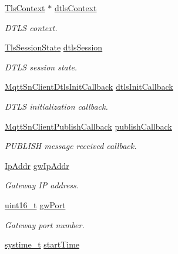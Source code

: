 \begin{DoxyCompactItemize}
\hyperlink{tls_8h_ac09f7a286c0cdf9b07ee1edd107946f5}{Tls\+Context} $\ast$ \hyperlink{struct__MqttSnClientContext_abf7251659cdc6c9ecd3d47335525c423}{dtls\+Context}
\begin{DoxyCompactList}\small\item\em D\+T\+LS context. \end{DoxyCompactList}\item 
\hyperlink{structTlsSessionState}{Tls\+Session\+State} \hyperlink{struct__MqttSnClientContext_a4b1830b1b171b20595d7aae273e3ecdd}{dtls\+Session}
\begin{DoxyCompactList}\small\item\em D\+T\+LS session state. \end{DoxyCompactList}\item 
\hyperlink{mqtt__sn__client_8h_a0aa65bd0e127e05595c247c01aeca2d5}{Mqtt\+Sn\+Client\+Dtls\+Init\+Callback} \hyperlink{struct__MqttSnClientContext_ab8aacb0497d1136187224400815cf184}{dtls\+Init\+Callback}
\begin{DoxyCompactList}\small\item\em D\+T\+LS initialization callback. \end{DoxyCompactList}\item 
\hyperlink{mqtt__sn__client_8h_a4f0890f5b533cda2ad972b1e433cf109}{Mqtt\+Sn\+Client\+Publish\+Callback} \hyperlink{struct__MqttSnClientContext_a7f815351293c416493cad33b87af151f}{publish\+Callback}
\begin{DoxyCompactList}\small\item\em P\+U\+B\+L\+I\+SH message received callback. \end{DoxyCompactList}\item 
\hyperlink{structIpAddr}{Ip\+Addr} \hyperlink{struct__MqttSnClientContext_a147c9e040547d21990c0ed14aa97fd8e}{gw\+Ip\+Addr}
\begin{DoxyCompactList}\small\item\em Gateway IP address. \end{DoxyCompactList}\item 
\hyperlink{stdint_8h_a273cf69d639a59973b6019625df33e30}{uint16\+\_\+t} \hyperlink{struct__MqttSnClientContext_a40d2532002b4ff064dc5304dd914d009}{gw\+Port}
\begin{DoxyCompactList}\small\item\em Gateway port number. \end{DoxyCompactList}\item 
\hyperlink{compiler__port_8h_ae3e32a98d431a02106616da3071832dd}{systime\+\_\+t} \hyperlink{struct__MqttSnClientContext_a6d66c3cc9f080b7779e43e6ef5f22e63}{start\+Time}

\end{DoxyCompactItemize}
